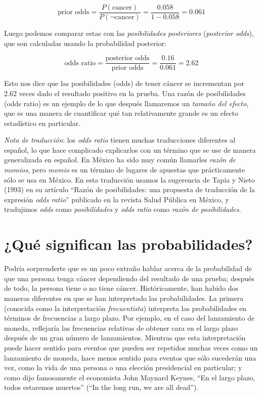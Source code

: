 \documentclass[
  12pt,
]{book}
\theoremstyle{definition}
\theoremstyle{definition}
\theoremstyle{definition}
\theoremstyle{remark}
\begin{document}
\[
\text{prior odds} = \frac{P(\text{cancer})}{P(\neg \text{cancer})} =\frac{0.058}{1 - 0.058} = 0.061
\]

Luego podemos comparar estas con las \emph{posibilidades posteriores} (\emph{posterior odds}), que son calculadas usando la probabilidad posterior:

\[
\text{odds ratio} = \frac{\text{posterior odds}}{\text{prior odds}} = \frac{0.16}{0.061} = 2.62
\]

Esto nos dice que las posibilidades (odds) de tener cáncer se incrementan por 2.62 veces dado el resultado positivo en la prueba. Una razón de posibilidades (odds ratio) es un ejemplo de lo que después llamaremos un \emph{tamaño del efecto}, que es una manera de cuantificar qué tan relativamente grande es un efecto estadístico en particular.

\emph{Nota de traducción}: los \emph{odds ratio} tienen muchas traducciones diferentes al español, lo que hace complicado explicarlos con un término que se use de manera generalizada en español. En México ha sido muy común llamarles \emph{razón de momios}, pero \emph{momio} es un término de lugares de apuestas que prácticamente sólo se usa en México. En esta traducción usamos la sugerencia de Tapia y Nieto (1993) en su artículo ``Razón de posibilidades: una propuesta de traducción de la expresión \emph{odds ratio}'' publicado en la revista Salud Pública en México, y tradujimos \emph{odds} como \emph{posibilidades} y \emph{odds ratio} como \emph{razón de posibilidades}.

\hypertarget{quuxe9-significan-las-probabilidades}{%
\section{¿Qué significan las probabilidades?}\label{quuxe9-significan-las-probabilidades}}

Podría sorprenderte que es un poco extraño hablar acerca de la probabilidad de que una persona tenga cáncer dependiendo del resultado de una prueba; después de todo, la persona tiene o no tiene cáncer. Históricamente, han habido dos maneras diferentes en que se han interpretado las probabilidades. La primera (conocida como la interpretación \emph{frecuentista}) interpreta las probabilidades en términos de frecuencias a largo plazo. Por ejemplo, en el caso del lanzamiento de moneda, reflejaría las frecuencias relativas de obtener cara en el largo plazo después de un gran número de lanzamientos. Mientras que esta interpretación puede hacer sentido para eventos que pueden ser repetidos muchas veces como un lanzamiento de moneda, hace menos sentido para eventos que sólo sucederán una vez, como la vida de una persona o una elección presidencial en particular; y como dijo famosamente el economista John Maynard Keynes, ``En el largo plazo, todos estaremos muertos'' (``In the long run, we are all dead'').
\end{document}
